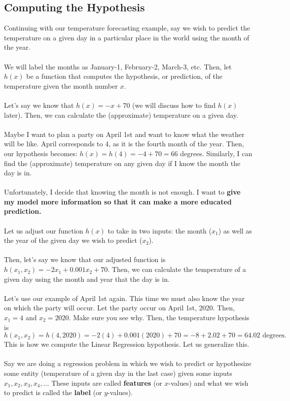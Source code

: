 \documentclass{article}
\begin{document}
\subsection{Computing the Hypothesis}
Continuing with our temperature forecasting example, say we wish to predict the temperature on a given day in a particular place in the world using the month of the year. 
\\
\\
We will label the months as January-1, February-2, March-3, etc. Then, let $h(x)$ be a function that computes the hypothesis, or prediction, of the temperature given the month number $x$.
\\
\\
Let's say we know that $h(x)=-x+70$ (we will discuss how to find $h(x)$ later). Then, we can calculate the (approximate) temperature on a given day.
\\
\\
Maybe I want to plan a party on April 1st and want to know what the weather will be like. April corresponds to 4, as it is the fourth month of the year. Then, our hypothesis becomes: $h(x)=h(4)=-4+70=66$ degrees. Similarly, I can find the (approximate) temperature on any given day if I know the month the day is in. 
\\
\\
Unfortunately, I decide that knowing the month is not enough. I want to \textbf{give my model more information so that it can make a more educated prediction.}
\\
\\
Let us adjust our function $h(x)$ to take in two inputs: the month ($x_1$) as well as the year of the given day we wish to predict ($x_2$). 
\\
\\
Then, let's say we know that our adjusted function is $h(x_1,x_2)=-2x_1+0.001x_2+70$. Then, we can calculate the temperature of a given day using the month and year that the day is in. 
\\
\\
Let's use our example of April 1st again. This time we must also know the year on which the party will occur. Let the party occur on April 1st, 2020. Then, $x_1=4$ and $x_2=2020$. Make sure you see why. Then, the temperature hypothesis is \[h(x_1,x_2)=h(4,2020)=-2(4)+0.001(2020)+70=-8+2.02+70=64.02\text{ degrees}.\]
This is how we compute the Linear Regression hypothesis. Let us generalize this.
\\
\\
Say we are doing a regression problem in which we wish to predict or hypothesize some entity (temperature of a given day in the last case) given some inputs $x_1,x_2,x_3,x_4,\ldots$ These inputs are called \textbf{features} (or $x$-values) and what we wish to predict is called the \textbf{label} (or $y$-values). 
\end{document}
